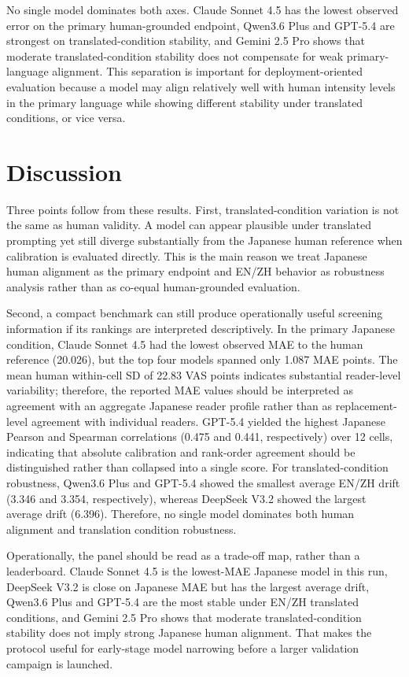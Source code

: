 \documentclass[conference,a4paper]{IEEEtran}
\begin{document}
No single model dominates both axes. Claude Sonnet 4.5 has the lowest observed error on the primary human-grounded endpoint, Qwen3.6 Plus and GPT-5.4 are strongest on translated-condition stability, and Gemini 2.5 Pro shows that moderate translated-condition stability does not compensate for weak primary-language alignment. This separation is important for deployment-oriented evaluation because a model may align relatively well with human intensity levels in the primary language while showing different stability under translated conditions, or vice versa.

\section{Discussion}
Three points follow from these results. First, translated-condition variation is not the same as human validity. A model can appear plausible under translated prompting yet still diverge substantially from the Japanese human reference when calibration is evaluated directly. This is the main reason we treat Japanese human alignment as the primary endpoint and EN/ZH behavior as robustness analysis rather than as co-equal human-grounded evaluation.

Second, a compact benchmark can still produce operationally useful screening information if its rankings are interpreted descriptively. In the primary Japanese condition, Claude Sonnet 4.5 had the lowest observed MAE to the human reference (20.026), but the top four models spanned only 1.087 MAE points. The mean human within-cell SD of 22.83 VAS points indicates substantial reader-level variability; therefore, the reported MAE values should be interpreted as agreement with an aggregate Japanese reader profile rather than as replacement-level agreement with individual readers. GPT-5.4 yielded the highest Japanese Pearson and Spearman correlations (0.475 and 0.441, respectively) over 12 cells, indicating that absolute calibration and rank-order agreement should be distinguished rather than collapsed into a single score. For translated-condition robustness, Qwen3.6 Plus and GPT-5.4 showed the smallest average EN/ZH drift (3.346 and 3.354, respectively), whereas DeepSeek V3.2 showed the largest average drift (6.396). Therefore, no single model dominates both human alignment and translation condition robustness.

Operationally, the panel should be read as a trade-off map, rather than a leaderboard. Claude Sonnet 4.5 is the lowest-MAE Japanese model in this run, DeepSeek V3.2 is close on Japanese MAE but has the largest average drift, Qwen3.6 Plus and GPT-5.4 are the most stable under EN/ZH translated conditions, and Gemini 2.5 Pro shows that moderate translated-condition stability does not imply strong Japanese human alignment. That makes the protocol useful for early-stage model narrowing before a larger validation campaign is launched.
\end{document}
